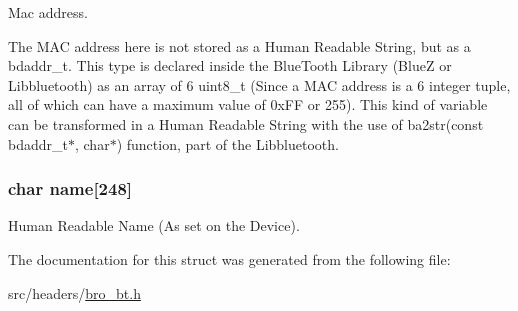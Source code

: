 Mac address. 

The MAC address here is not stored as a Human Readable String, but as a {\ttfamily bdaddr\_\-t}. This type is declared inside the BlueTooth Library ({\ttfamily BlueZ} or {\ttfamily Libbluetooth}) as an array of 6 {\ttfamily uint8\_\-t} (Since a MAC address is a 6 integer tuple, all of which can have a maximum value of 0xFF or 255). This kind of variable can be transformed in a Human Readable String with the use of ba2str(const bdaddr\_\-t$\ast$, char$\ast$) function, part of the Libbluetooth. \hypertarget{structbro__bt__device__t_ab68bf00ae4a0036aee3d3371354748de}{
\subsubsection[{name}]{\setlength{\rightskip}{0pt plus 5cm}char {\bf name}\mbox{[}248\mbox{]}}}
\label{structbro__bt__device__t_ab68bf00ae4a0036aee3d3371354748de}


Human Readable Name (As set on the Device). 



The documentation for this struct was generated from the following file:\begin{DoxyCompactItemize}
\item 
src/headers/\hyperlink{bro__bt_8h}{bro\_\-bt.h}\end{DoxyCompactItemize}
